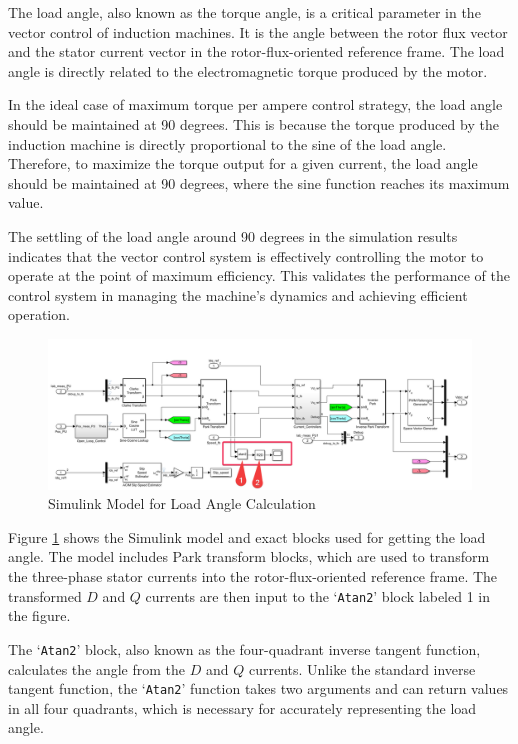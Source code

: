 The load angle, also known as the torque angle, is a critical parameter in the vector control of induction machines. It is the angle between the rotor flux vector and the stator current vector in the rotor-flux-oriented reference frame. The load angle is directly related to the electromagnetic torque produced by the motor. 

In the ideal case of maximum torque per ampere control strategy, the load angle should be maintained at 90 degrees. This is because the torque produced by the induction machine is directly proportional to the sine of the load angle. Therefore, to maximize the torque output for a given current, the load angle should be maintained at 90 degrees, where the sine function reaches its maximum value.

The settling of the load angle around 90 degrees in the simulation results indicates that the vector control system is effectively controlling the motor to operate at the point of maximum efficiency. This validates the performance of the control system in managing the machine's dynamics and achieving efficient operation.


\begin{figure}[H]
	\centering
	\includegraphics[width=6in]{sections/section3/images/simulationResutls/howTogetloadAngle.png}
	\caption{Simulink Model for Load Angle Calculation}
	\label{fig:simulink_model}
\end{figure}


Figure \ref{fig:simulink_model} shows the Simulink model and exact blocks used for getting the load angle. The model includes Park transform blocks, which are used to transform the three-phase stator currents into the rotor-flux-oriented reference frame. The transformed $D$ and $Q$ currents are then input to the `\texttt{Atan2}' block labeled 1 in the figure.

The `\texttt{Atan2}' block, also known as the four-quadrant inverse tangent function, calculates the angle from the $D$ and $Q$ currents. Unlike the standard inverse tangent function, the `\texttt{Atan2}' function takes two arguments and can return values in all four quadrants, which is necessary for accurately representing the load angle.

